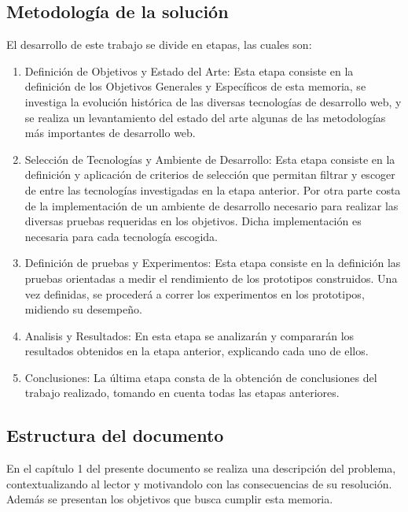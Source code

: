 \subsection{Metodología de la solución}
 
El desarrollo de este trabajo se divide en etapas, las cuales son:
\begin{enumerate}
 \item Definición de Objetivos y Estado del Arte: Esta etapa consiste en la definición de los Objetivos Generales 
 y Específicos de esta memoria, se investiga la evolución histórica de las diversas tecnologías de desarrollo web, 
 y se realiza un levantamiento del estado del arte algunas de las metodologías más importantes de desarrollo web.
 
 \item Selección de Tecnologías y Ambiente de Desarrollo: Esta etapa consiste en la definición y
 aplicación de criterios de selección que permitan filtrar y escoger de entre las tecnologías investigadas en la etapa 
 anterior. Por otra parte costa de la implementación de un ambiente de desarrollo necesario para realizar las diversas 
 pruebas requeridas en los objetivos. Dicha implementación es necesaria para cada tecnología escogida.
 
 \item Definición de pruebas y Experimentos: Esta etapa consiste en la definición las pruebas orientadas a medir el 
 rendimiento de los prototipos construidos. Una vez definidas, se procederá a correr los experimentos en los prototipos, 
 midiendo su desempeño.
 
 \item Analisis y Resultados: En esta etapa se analizarán y compararán los resultados obtenidos en la etapa anterior,
 explicando cada uno de ellos.
 
 \item Conclusiones: La última etapa consta de la obtención de conclusiones del trabajo realizado, tomando
 en cuenta todas las etapas anteriores.
\end{enumerate}

\subsection{Estructura del documento}

En el capítulo 1 del presente documento se realiza una descripción del problema, contextualizando 
al lector y motivandolo con las consecuencias de su resolución. Además se presentan los objetivos 
que busca cumplir esta memoria.\\

